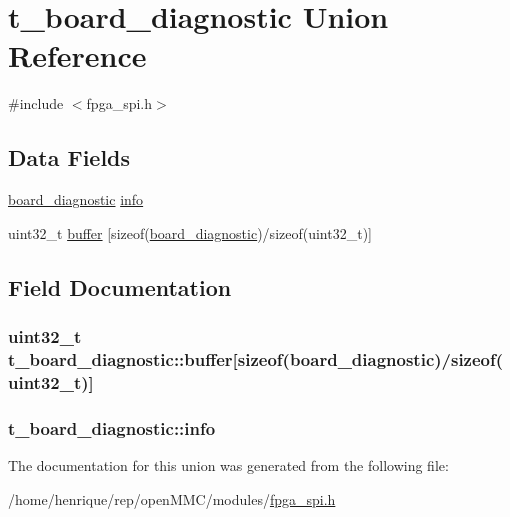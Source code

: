 \hypertarget{uniont__board__diagnostic}{\section{t\-\_\-board\-\_\-diagnostic Union Reference}
\label{uniont__board__diagnostic}
}


{\ttfamily \#include $<$fpga\-\_\-spi.\-h$>$}

\subsection*{Data Fields}
\begin{DoxyCompactItemize}
\item 
\hyperlink{fpga__spi_8h_a8332ac93726c251f7db5bc8b26a24234}{board\-\_\-diagnostic} \hyperlink{uniont__board__diagnostic_ac3ee830f0459cb6f00382ad432388897}{info}
\item 
uint32\-\_\-t \hyperlink{uniont__board__diagnostic_a594e8d5ead9734741112e9f24c80f35f}{buffer} \mbox{[}sizeof(\hyperlink{fpga__spi_8h_a8332ac93726c251f7db5bc8b26a24234}{board\-\_\-diagnostic})/sizeof(uint32\-\_\-t)\mbox{]}
\end{DoxyCompactItemize}


\subsection{Field Documentation}
\hypertarget{uniont__board__diagnostic_a594e8d5ead9734741112e9f24c80f35f}{
\subsubsection[{buffer}]{\setlength{\rightskip}{0pt plus 5cm}uint32\-\_\-t t\-\_\-board\-\_\-diagnostic\-::buffer\mbox{[}sizeof({\bf board\-\_\-diagnostic})/sizeof(uint32\-\_\-t)\mbox{]}}}\label{uniont__board__diagnostic_a594e8d5ead9734741112e9f24c80f35f}
\hypertarget{uniont__board__diagnostic_ac3ee830f0459cb6f00382ad432388897}{
\subsubsection[{info}]{ t\-\_\-board\-\_\-diagnostic\-::info}}\label{uniont__board__diagnostic_ac3ee830f0459cb6f00382ad432388897}


The documentation for this union was generated from the following file\-:\begin{DoxyCompactItemize}
\item 
/home/henrique/rep/open\-M\-M\-C/modules/\hyperlink{fpga__spi_8h}{fpga\-\_\-spi.\-h}\end{DoxyCompactItemize}
